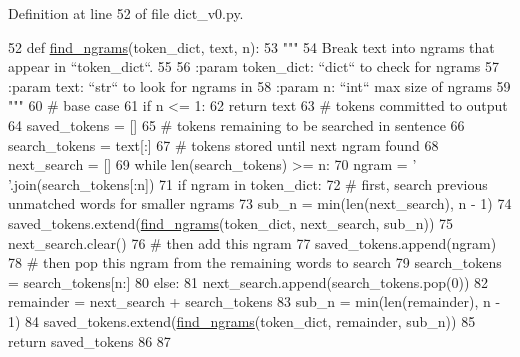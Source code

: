 Definition at line 52 of file dict\+\_\+v0.\+py.


\begin{DoxyCode}
52 \textcolor{keyword}{def }\hyperlink{namespaceparlai_1_1agents_1_1legacy__agents_1_1seq2seq_1_1dict__v0_aa7398720bbf0f8e82c5b1495313f4f8b}{find\_ngrams}(token\_dict, text, n):
53     \textcolor{stringliteral}{"""}
54 \textcolor{stringliteral}{    Break text into ngrams that appear in ``token\_dict``.}
55 \textcolor{stringliteral}{}
56 \textcolor{stringliteral}{    :param token\_dict: ``dict`` to check for ngrams}
57 \textcolor{stringliteral}{    :param text: ``str`` to look for ngrams in}
58 \textcolor{stringliteral}{    :param n: ``int`` max size of ngrams}
59 \textcolor{stringliteral}{    """}
60     \textcolor{comment}{# base case}
61     \textcolor{keywordflow}{if} n <= 1:
62         \textcolor{keywordflow}{return} text
63     \textcolor{comment}{# tokens committed to output}
64     saved\_tokens = []
65     \textcolor{comment}{# tokens remaining to be searched in sentence}
66     search\_tokens = text[:]
67     \textcolor{comment}{# tokens stored until next ngram found}
68     next\_search = []
69     \textcolor{keywordflow}{while} len(search\_tokens) >= n:
70         ngram = \textcolor{stringliteral}{' '}.join(search\_tokens[:n])
71         \textcolor{keywordflow}{if} ngram \textcolor{keywordflow}{in} token\_dict:
72             \textcolor{comment}{# first, search previous unmatched words for smaller ngrams}
73             sub\_n = min(len(next\_search), n - 1)
74             saved\_tokens.extend(\hyperlink{namespaceparlai_1_1agents_1_1legacy__agents_1_1seq2seq_1_1dict__v0_aa7398720bbf0f8e82c5b1495313f4f8b}{find\_ngrams}(token\_dict, next\_search, sub\_n))
75             next\_search.clear()
76             \textcolor{comment}{# then add this ngram}
77             saved\_tokens.append(ngram)
78             \textcolor{comment}{# then pop this ngram from the remaining words to search}
79             search\_tokens = search\_tokens[n:]
80         \textcolor{keywordflow}{else}:
81             next\_search.append(search\_tokens.pop(0))
82     remainder = next\_search + search\_tokens
83     sub\_n = min(len(remainder), n - 1)
84     saved\_tokens.extend(\hyperlink{namespaceparlai_1_1agents_1_1legacy__agents_1_1seq2seq_1_1dict__v0_aa7398720bbf0f8e82c5b1495313f4f8b}{find\_ngrams}(token\_dict, remainder, sub\_n))
85     \textcolor{keywordflow}{return} saved\_tokens
86 
87 
\end{DoxyCode}
\mbox{\label{namespaceparlai_1_1agents_1_1legacy__agents_1_1seq2seq_1_1dict__v0_a1803c89a6cc7d5323a31a1f7e79728ed}} 
